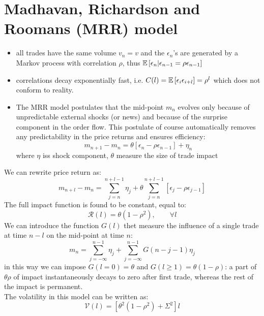 \section{Madhavan, Richardson and Roomans (MRR) model}
\begin{mysetting}
	\begin{itemize}
		\item all trades have the same volume $v_n = v$ and the $\epsilon_n$’s are generated by a Markov process with correlation $\rho$, thus $\mathbb{E}\left[\epsilon_n|\epsilon_{n-1} = \rho \epsilon_{n-1}\right]$
		\item correlations decay exponentially fast, i.e. $C(l) = \mathbb{E}\left[\epsilon_i \epsilon_{i+l}\right] = \rho^l$ which does not conform to reality.
	\end{itemize}
\end{mysetting}
\begin{mysetting}
\begin{itemize}
	\item The MRR model postulates that the mid-point $m_n$ evolves only because of unpredictable external shocks (or news) and because of the surprise component in the order flow. This postulate of course automatically removes any predictability in the price returns and ensures efficiency:
	\[
	m_{n+1} - m_n = \theta[\epsilon_n - \rho \epsilon_{n-1}] + \eta_n
	\]
	where $\eta$ iss shock component, $\theta$ measure the size of trade impact
\end{itemize}
\end{mysetting}
We can rewrite price return as:
\[
m_{n+l} - m_n = \sum_{j=n}^{n+l-1} \eta_j + \theta \sum_{j =n}^{n+l-1} [\epsilon_j - \rho \epsilon_{j-1}]
\]
The full impact function is found to be constant, equal to:
\[
\mathcal{R}(l) = \theta(1 - \rho^2), \qquad \forall l
\]
We can introduce the function $G(l)$ thet measure the influence of a single trade at time $n-l$ on the mid-point at time $n$:
\begin{equation}
m_n = \sum_{j = -\infty}^{n-1}\eta_j + \sum_{j = -\infty}^{n-1} G (n-j-1)\eta_j
\label{mid_point_G_MRR}
\end{equation}
in this way we can impose $G(l=0) = \theta$ and $G(l\geq 1) = \theta(1-\rho)$: a part of $\theta \rho$ of impact instantaneously decays to zero after first trade, whereas the rest of the impact is permanent.\\
The volatility in this model can be written as:
\[
\mathcal{V}(l) = [ \theta^2(1-  \rho^2) +\Sigma^2]l
\]
